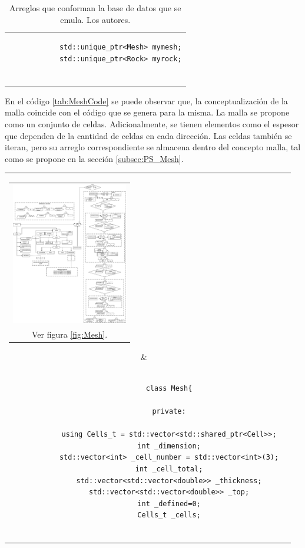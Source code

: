\begin{appendix}
\begin{table}
\begin{tabular}{c}
\begin{tiny}
\begin{lstlisting}
			std::unique_ptr<Mesh> mymesh;
			std::unique_ptr<Rock> myrock;
			
			\end{lstlisting}
		\end{tiny}
	\end{tabular}
	\label{tab:bd}
	\caption[Arreglos que conforman la base de datos que se emula.]{Arreglos que conforman la base de datos que se emula. Los autores.}
\end{table}

En el código \ref{tab:MeshCode} se puede observar que, la conceptualización de la malla coincide con el código que se genera para la misma. La malla se propone como un conjunto de celdas. Adicionalmente, se tienen elementos como el espesor que dependen de la cantidad de celdas en cada dirección. Las celdas también se iteran, pero su arreglo correspondiente se almacena dentro del concepto malla, tal como se propone en la sección \ref{subsec:PS_Mesh}.\\

\begin{table}[h]
	\centering
	\begin{tabular}{cc}
		\parbox[c]{5em}{
			\begin{tabular}[c]{@{}c@{}}\includegraphics[width=2in]{Fig/Mesh.pdf}\\ Ver figura \ref{fig:Mesh}.\end{tabular}
		}
		&
		\begin{tiny}
			\begin{lstlisting}
			
			class Mesh{
			
			private:
			
			using Cells_t = std::vector<std::shared_ptr<Cell>>;
			int _dimension;
			std::vector<int> _cell_number = std::vector<int>(3);
			int _cell_total;
			std::vector<std::vector<double>> _thickness;
			std::vector<std::vector<double>> _top;
			int _defined=0;
			Cells_t _cells;
			

\end{lstlisting}
\end{tiny}
\end{tabular}
\end{table}
\end{appendix}
